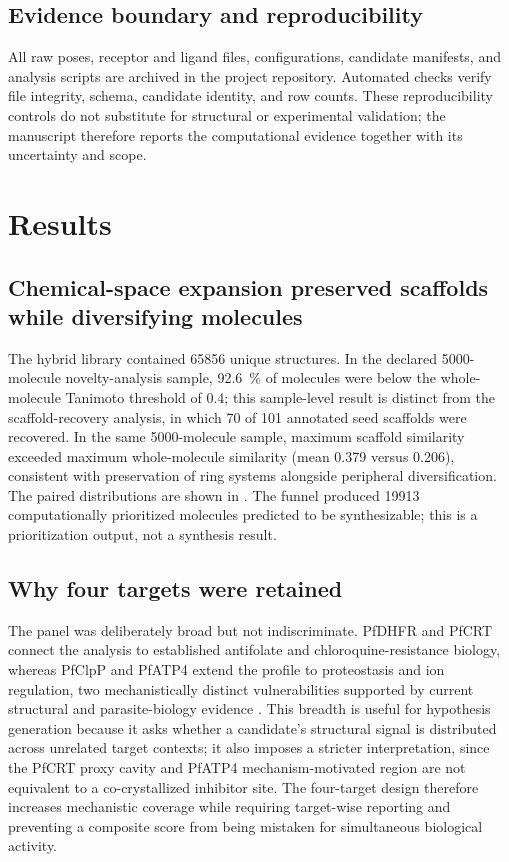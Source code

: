 \documentclass[journal=jcisd8,manuscript=article]{achemso}
\begin{document}
\subsection{Evidence boundary and reproducibility}
All raw poses, receptor and ligand files, configurations, candidate manifests, and analysis scripts are archived in the project repository. Automated checks verify file integrity, schema, candidate identity, and row counts. These reproducibility controls do not substitute for structural or experimental validation; the manuscript therefore reports the computational evidence together with its uncertainty and scope.

\section{Results}
\subsection{Chemical-space expansion preserved scaffolds while diversifying molecules}
The hybrid library contained \num{65856} unique structures. In the declared \num{5000}-molecule novelty-analysis sample, \qty{92.6}{\percent} of molecules were below the whole-molecule Tanimoto threshold of \num{0.4}; this sample-level result is distinct from the scaffold-recovery analysis, in which \num{70} of \num{101} annotated seed scaffolds were recovered. In the same \num{5000}-molecule sample, maximum scaffold similarity exceeded maximum whole-molecule similarity (mean \num{0.379} versus \num{0.206}), consistent with preservation of ring systems alongside peripheral diversification. The paired distributions are shown in . The funnel produced \num{19913} computationally prioritized molecules predicted to be synthesizable; this is a prioritization output, not a synthesis result.

\subsection{Why four targets were retained}
The panel was deliberately broad but not indiscriminate. PfDHFR and PfCRT connect the analysis to established antifolate and chloroquine-resistance biology, whereas PfClpP and PfATP4 extend the profile to proteostasis and ion regulation, two mechanistically distinct vulnerabilities supported by current structural and parasite-biology evidence \cite{Tissawak2025,Haile2025}. This breadth is useful for hypothesis generation because it asks whether a candidate's structural signal is distributed across unrelated target contexts; it also imposes a stricter interpretation, since the PfCRT proxy cavity and PfATP4 mechanism-motivated region are not equivalent to a co-crystallized inhibitor site. The four-target design therefore increases mechanistic coverage while requiring target-wise reporting and preventing a composite score from being mistaken for simultaneous biological activity.
\end{document}
